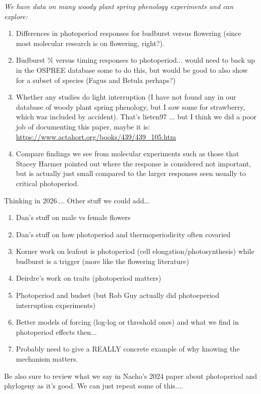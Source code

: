 \documentclass[11pt]{article}
\begin{document}
\emph{We have data on many woody plant spring phenology experiments and can explore:}
\begin{enumerate}
\item Differences in photoperiod responses for budburst versus flowering (since most molecular research is on flowering, right?).
\item Budburst \% versus timing responses to photoperiod... would need to back up in the OSPREE database some to do this, but would be good to also show for a subset of species (Fagus and Betula perhaps?) 
\item Whether any studies do light interruption (I have not found any in our database of woody plant spring phenology, but I saw some for strawberry, which was included by accident). That's lieten97 ... but I think we did a poor job of documenting this paper, maybe it is: \url{https://www.actahort.org/books/439/439_105.htm}
\item Compare findings we see from molecular experiments such as those that Stacey Harmer pointed out where the response is considered not important, but is actually just small compared to the larger responses seen usually to critical photoperiod. 
\end{enumerate}


Thinking in 2026....
Other stuff we could add...
\begin{enumerate}
\item Dan's stuff on male vs female flowers
\item Dan's stuff on how photoperiod and thermoperiodicity often covaried 
\item Korner work on leafout is photoperiod (cell elongation/photosynthesis) while budburst is a trigger (more like the flowering literature) 
\item Deirdre's work on traits (photoperiod matters)
\item Photoperiod and budset (but Rob Guy actually did photoeperiod interruption experiments)
\item Better models of forcing (log-log or threshold ones) and what we find in photoperiod effects then...
\item Probably need to give a REALLY concrete example of why knowing the mechanism matters.
\end{enumerate}


Be also sure to review what we say in Nacho's 2024 paper about photoperiod and phylogeny as it's good. We can just repeat some of this....
\end{document}
